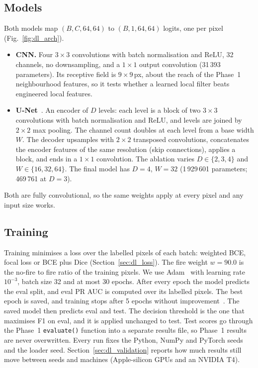 \subsection{Models}

Both models map $(B, C, 64, 64)$ to $(B, 1, 64, 64)$ logits, one per pixel (Fig.~\ref{fig:dl_arch}).
\begin{itemize}
\item \textbf{CNN.} Four $3\times3$ convolutions with batch normalisation and ReLU, 32 channels, no
downsampling, and a $1\times1$ output convolution (31\,393 parameters). Its receptive field is
$9\times9$\,px, about the reach of the Phase~1 neighbourhood features, so it tests whether a learned
local filter beats engineered local features.
\item \textbf{U-Net}~\cite{ronneberger2015}. An encoder of $D$ levels: each level is a block of two
$3\times3$ convolutions with batch normalisation and ReLU, and levels are joined by $2\times2$ max
pooling. The channel count doubles at each level from a base width $W$. The decoder upsamples with
$2\times2$ transposed convolutions, concatenates the encoder features of the same resolution (skip
connections), applies a block, and ends in a $1\times1$ convolution. The ablation varies $D \in
\{2, 3, 4\}$ and $W \in \{16, 32, 64\}$. The final model has $D = 4$, $W = 32$ (1\,929\,601 parameters;
469\,761 at $D = 3$).
\end{itemize}
Both are fully convolutional, so the same weights apply at every pixel and any input size works.

\subsection{Training}

Training minimises a loss over the labelled pixels of each batch: weighted BCE, focal loss or BCE plus
Dice (Section~\ref{sec:dl_loss}). The fire weight $w = 90.0$ is the no-fire to fire ratio of the training
pixels. We use Adam~\cite{kingma2015} with learning rate $10^{-3}$, batch size 32 and at most 30 epochs.
After every epoch the model predicts the eval split, and eval PR AUC is computed over its labelled pixels.
The best epoch is saved, and training stops after 5 epochs without improvement~\cite{prechelt1998}. The
saved model then predicts eval and test. The decision threshold is the one that maximises F1 on eval, and
it is applied unchanged to test. Test scores go through the Phase~1 \texttt{evaluate()} function into a
separate results file, so Phase~1 results are never overwritten. Every run fixes the Python, NumPy and
PyTorch seeds and the loader seed. Section~\ref{sec:dl_validation} reports how much results still move
between seeds and machines (Apple-silicon GPUs and an NVIDIA T4).

